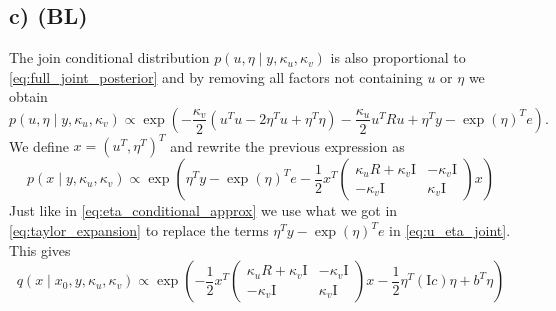 \documentclass[a4paper]{article}\usepackage[]{graphicx}\usepackage[]{color}
\begin{document}
\subsection*{c) (BL)}
The join conditional distribution $p(u, \eta \mid y, \kappa_u, \kappa_v)$ is also proportional to \eqref{eq:full_joint_posterior} and by removing all factors not containing $u$ or $\eta$ we obtain
\begin{equation}
p(u, \eta \mid y, \kappa_u, \kappa_v) \propto \exp\left(-\frac{\kappa_v}{2}(u^Tu - 2\eta^Tu + \eta^T \eta) - \frac{\kappa_u}{2}u^TRu + \eta^T y - \exp(\eta)^T e\right).
\end{equation}
We define $x = (u^T, \eta^T)^T$ and rewrite the previous expression as
\begin{equation}
p(x \mid y, \kappa_u, \kappa_v) \propto \exp\left(\eta^Ty - \exp(\eta)^Te - \frac{1}{2} x^T
\begin{pmatrix}
\kappa_u R + \kappa_v \mathrm{I} & -\kappa_v \mathrm{I} \\
-\kappa_v \mathrm{I}             &  \kappa_v \mathrm{I}
\end{pmatrix}
x
\right)
\label{eq:u_eta_joint}
\end{equation}
Just like in \eqref{eq:eta_conditional_approx} we use what we got in \eqref{eq:taylor_expansion} to replace the terms $\eta^T y - \exp(\eta)^T e$ in \eqref{eq:u_eta_joint}. This gives
\begin{equation}
q(x \mid x_0, y, \kappa_u, \kappa_v) \propto \exp\left(
- \frac{1}{2} x^T
\begin{pmatrix}
\kappa_u R + \kappa_v \mathrm{I} & -\kappa_v \mathrm{I} \\
-\kappa_v \mathrm{I}             &  \kappa_v \mathrm{I}
\end{pmatrix}
x
- \frac{1}{2}\eta^T (\mathrm{I}c) \eta + b^T \eta
\right)
\label{eq:u_eta_joint_approx}
\end{equation}
\end{document}
